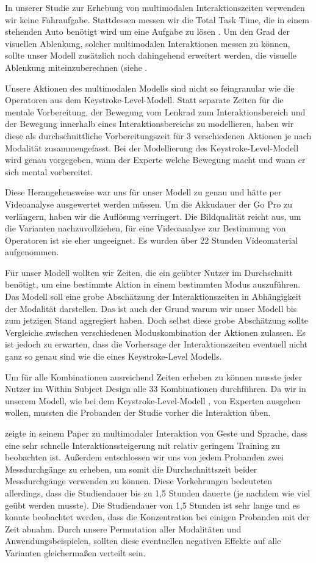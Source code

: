 In unserer Studie zur Erhebung von multimodalen Interaktionszeiten verwenden wir keine Fahraufgabe. Stattdessen messen wir die Total Task Time, die in einem stehenden Auto benötigt wird um eine Aufgabe zu lösen \citep{green1999sae}. Um den Grad der visuellen Ablenkung, solcher multimodalen Interaktionen messen zu können, sollte unser Modell zusätzlich noch dahingehend erweitert werden, die visuelle Ablenkung miteinzuberechnen (siehe \citep{Pettitt_2007}.

Unsere Aktionen des multimodalen Modells sind nicht so feingranular wie die Operatoren aus dem Keystroke-Level-Modell. Statt separate Zeiten für die mentale Vorbereitung, der Bewegung vom Lenkrad zum Interaktionsbereich und der Bewegung innerhalb eines Interaktionsbereichs zu modellieren, haben wir diese als durchschnittliche Vorbereitungszeit für 3 verschiedenen Aktionen je nach Modalität zusammengefasst. Bei der Modellierung des Keystroke-Level-Modell wird genau vorgegeben, wann der Experte welche Bewegung macht und wann er sich mental vorbereitet. 

Diese Herangehensweise war uns für unser Modell zu genau und hätte per Videoanalyse ausgewertet werden müssen. Um die Akkudauer der Go Pro zu verlängern, haben wir die Auflösung verringert. Die Bildqualität reicht aus, um die Varianten nachzuvollziehen, für eine Videoanalyse zur Bestimmung von Operatoren ist sie eher ungeeignet. Es wurden über 22 Stunden Videomaterial aufgenommen.

Für unser Modell wollten wir Zeiten, die ein geübter Nutzer im Durchschnitt benötigt, um eine bestimmte Aktion in einem bestimmten Modus auszuführen. Das Modell soll eine grobe Abschätzung der Interaktionszeiten in Abhängigkeit der Modalität darstellen. Das ist auch der Grund warum wir unser Modell bis zum jetzigen Stand aggregiert haben. Doch selbst diese grobe Abschätzung sollte Vergleiche zwischen verschiedenen Moduskombination der Aktionen zulassen. Es ist jedoch zu erwarten, dass die Vorhersage der Interaktionszeiten eventuell nicht ganz so genau sind wie die eines Keystroke-Level Modells.

Um für alle Kombinationen ausreichend Zeiten erheben zu können musste jeder Nutzer im Within Subject Design alle 33 Kombinationen durchführen. Da wir in unserem Modell, wie bei dem Keystroke-Level-Modell \citep{Card_1980}, von Experten ausgehen wollen, mussten die Probanden der Studie vorher die Interaktion üben. 

\citet{Jude:2014} zeigte in seinem Paper zu multimodaler Interaktion von Geste und Sprache, dass eine sehr schnelle Interaktionssteigerung mit relativ geringem Training zu beobachten ist. 
Außerdem entschlossen wir uns von jedem Probanden zwei Messdurchgänge zu erheben, um somit die Durchschnittszeit beider Messdurchgänge verwenden zu können. Diese Vorkehrungen bedeuteten allerdings, dass die Studiendauer bis zu 1,5 Stunden dauerte (je nachdem wie viel geübt werden musste). Die Studiendauer von 1,5 Stunden ist sehr lange und es konnte beobachtet werden, dass die Konzentration bei einigen Probanden mit der Zeit abnahm. Durch unsere Permutation aller Modalitäten und Anwendungsbeispielen, sollten diese eventuellen negativen Effekte auf alle Varianten gleichermaßen verteilt sein.

